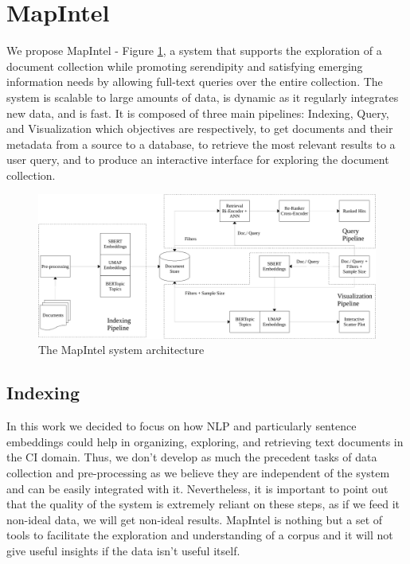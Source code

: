 \documentclass[a4paper]{article}
\begin{document}

\section{MapIntel}
We propose MapIntel - Figure \ref{system_architecture}, a system that supports the exploration of a document collection while promoting serendipity and satisfying emerging information needs by allowing full-text queries over the entire collection.
The system is scalable to large amounts of data, is dynamic as it regularly integrates new data, and is fast. It is composed of three main pipelines: Indexing, Query, and Visualization which objectives are respectively, to get documents and their metadata from a source to a database, to retrieve the most relevant results to a user query, and to produce an interactive interface for exploring the document collection. 

\begin{figure}[H]
  \centering
  \includegraphics[scale=0.5]{./assets/system_architecture}
  \caption{The MapIntel system architecture}
  \label{system_architecture}
\end{figure}

\subsection{Indexing} \label{indexing}
In this work we decided to focus on how NLP and particularly sentence embeddings could help in organizing, exploring, and retrieving text documents in the CI domain. Thus, we don't develop as much the precedent tasks of data collection and pre-processing as we believe they are independent of the system and can be easily integrated with it. Nevertheless, it is important to point out that the quality of the system is extremely reliant on these steps, as if we feed it non-ideal data, we will get non-ideal results. MapIntel is nothing but a set of tools to facilitate the exploration and understanding of a corpus and it will not give useful insights if the data isn't useful itself. 
\end{document}
